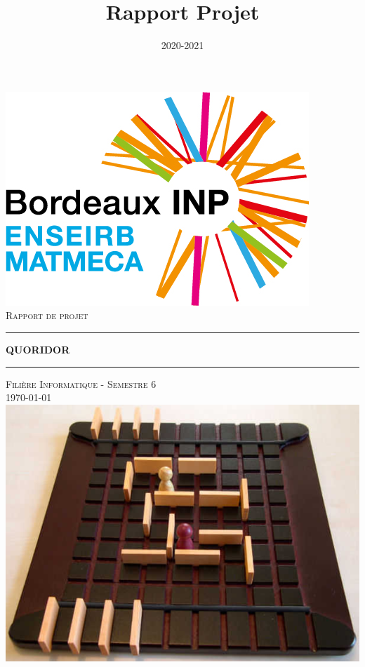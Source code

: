\documentclass[11pt]{article}
\title{Rapport Projet}
\date{2020-2021}
\begin{document}
\begin{titlepage}
\centering
\includegraphics[scale=0.4]{enseirb.png}
\\
\vspace*{1\baselineskip}
\LARGE{\textsc{Rapport de projet}}
\vspace*{0.8\baselineskip}
\rule{1\linewidth}{1pt}

\huge{\textbf{QUORIDOR}}
\vspace*{1\baselineskip}
\rule{1\linewidth}{1pt}
\vspace*{1\baselineskip}
\LARGE{\textsc{Filière Informatique - Semestre 6}}
\\

\large{\today}
\vspace*{3\baselineskip}
\\
\centering
\includegraphics[scale=1.4]{quoridor.png}
\\
\vspace*{4\baselineskip}


\end{titlepage}
\end{document}
